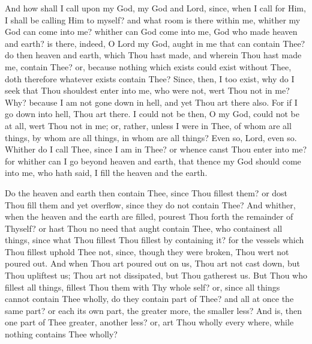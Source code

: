 \documentclass[b5paper,openright,12pt,twoside]{book}
\begin{document}
And how shall I call upon my God, my God and Lord, since, when I call
for Him, I shall be calling Him to myself? and what room is there within
me, whither my God can come into me? whither can God come into me, God
who made heaven and earth? is there, indeed, O Lord my God, aught in me
that can contain Thee? do then heaven and earth, which Thou hast made,
and wherein Thou hast made me, contain Thee? or, because nothing which
exists could exist without Thee, doth therefore whatever exists contain
Thee? Since, then, I too exist, why do I seek that Thou shouldest enter
into me, who were not, wert Thou not in me? Why? because I am not gone
down in hell, and yet Thou art there also. For if I go down into hell,
Thou art there. I could not be then, O my God, could not be at all,
wert Thou not in me; or, rather, unless I were in Thee, of whom are all
things, by whom are all things, in whom are all things? Even so, Lord,
even so. Whither do I call Thee, since I am in Thee? or whence canst
Thou enter into me? for whither can I go beyond heaven and earth, that
thence my God should come into me, who hath said, I fill the heaven and
the earth.

Do the heaven and earth then contain Thee, since Thou fillest them? or
dost Thou fill them and yet overflow, since they do not contain Thee?
And whither, when the heaven and the earth are filled, pourest Thou
forth the remainder of Thyself? or hast Thou no need that aught contain
Thee, who containest all things, since what Thou fillest Thou fillest
by containing it? for the vessels which Thou fillest uphold Thee not,
since, though they were broken, Thou wert not poured out. And when Thou
art poured out on us, Thou art not cast down, but Thou upliftest us;
Thou art not dissipated, but Thou gatherest us. But Thou who fillest
all things, fillest Thou them with Thy whole self? or, since all things
cannot contain Thee wholly, do they contain part of Thee? and all at
once the same part? or each its own part, the greater more, the smaller
less? And is, then one part of Thee greater, another less? or, art Thou
wholly every where, while nothing contains Thee wholly?
\end{document}

